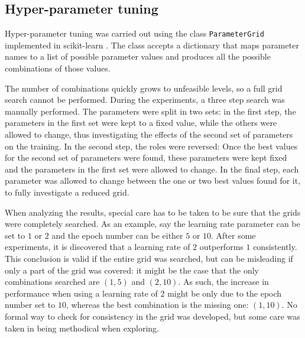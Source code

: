 

\subsection{Hyper-parameter tuning}

Hyper-parameter tuning was carried out using the class \texttt{ParameterGrid}
implemented in scikit-learn \cite{scikit-learn}.
The class accepts a dictionary that maps parameter names to a list of possible
parameter values and produces all the possible combinations of those values.

The number of combinations quickly grows to unfeasible levels, so a full grid
search cannot be performed.
During the experiments, a three step search was manually performed.
The parameters were split in two sets:
in the first step, the parameters in the first set were kept to a fixed value,
while the others were allowed to change, thus investigating the effects of the
second set of parameters on the training.
In the second step, the roles were reversed:
Once the best values for the second set of parameters were found, these
parameters were kept fixed and the parameters in the first set were allowed to
change.
In the final step, each parameter was allowed to change between the one or two
best values found for it, to fully investigate a reduced grid.

When analyzing the results, special care has to be taken to be sure that
the grids were completely searched.
As an example, say the learning rate parameter can be set to $1$ or $2$
and the epoch number can be either $5$ or $10$.
After some experiments, it is discovered that a learning rate of $2$
outperforms $1$ consistently.
This conclusion is valid if the entire grid was searched, but can be misleading
if only a part of the grid was covered: it might be the case that the only
combinations searched are $(1, 5)$ and $(2, 10)$.
As such, the increase in performance when using a learning rate of $2$ might be
only due to the epoch number set to $10$, whereas the best combination is the
missing one: $(1, 10)$.
No formal way to check for consistency in the grid was developed,
but some care was taken in being methodical when exploring.

